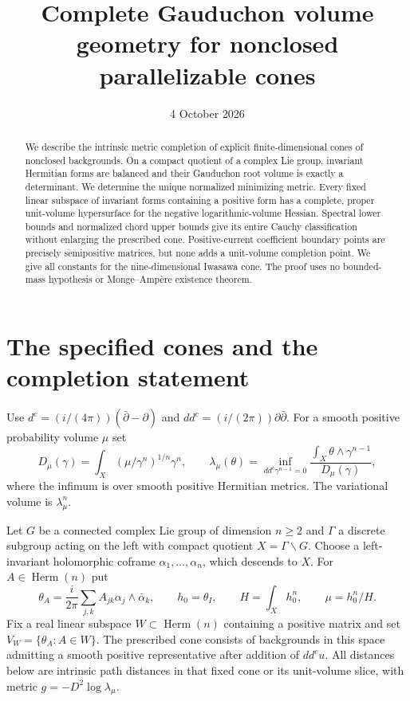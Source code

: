 \documentclass[11pt]{article}
\title{Complete Gauduchon volume geometry for nonclosed parallelizable cones}
\author{}
\date{4 October 2026}
\newcommand{\ddc}{dd^c}
\newcommand{\Herm}{\operatorname{Herm}}
\begin{document}
\maketitle
\begin{abstract}
We describe the intrinsic metric completion of explicit finite-dimensional
cones of nonclosed backgrounds. On a compact quotient of a complex Lie
group, invariant Hermitian forms are balanced and their Gauduchon root
volume is exactly a determinant. We determine the unique normalized
minimizing metric. Every fixed linear subspace of invariant forms containing
a positive form has a complete, proper unit-volume hypersurface for the
negative logarithmic-volume Hessian. Spectral lower bounds and normalized
chord upper bounds give its entire Cauchy classification without enlarging
the prescribed cone. Positive-current coefficient boundary points are
precisely semipositive matrices, but none adds a unit-volume completion
point. We give all constants for the nine-dimensional Iwasawa cone.
The proof uses no bounded-mass hypothesis or Monge--Amp\`ere existence theorem.
\end{abstract}

\section{The specified cones and the completion statement}
Use $d^c=(i/(4\pi))(\bar\partial-\partial)$ and
$\ddc=(i/(2\pi))\partial\bar\partial$.
For a smooth positive probability volume $\mu$ set
\[
 D_\mu(\gamma)=\int_X(\mu/\gamma^n)^{1/n}\gamma^n,\qquad
 \lambda_\mu(\theta)=\inf_{\ddc\gamma^{n-1}=0}
       \frac{\int_X\theta\wedge\gamma^{n-1}}{D_\mu(\gamma)},
\]
where the infimum is over smooth positive Hermitian metrics.
The variational volume is $\lambda_\mu^n$.

Let $G$ be a connected complex Lie group of dimension $n\geq2$ and
$\Gamma$ a discrete subgroup acting on the left with compact quotient
$X=\Gamma\backslash G$. Choose a left-invariant holomorphic coframe
$\alpha_1,\ldots,\alpha_n$, which descends to $X$. For $A\in\Herm(n)$ put
\[
 \theta_A=\frac{i}{2\pi}\sum_{j,k}A_{jk}\alpha_j\wedge\bar\alpha_k,
 \qquad h_0=\theta_I,\qquad H=\int_Xh_0^n,\qquad \mu=h_0^n/H.
\]
Fix a real linear subspace $W\subset\Herm(n)$ containing a positive
matrix and set $V_W=\{\theta_A:A\in W\}$.
The prescribed cone consists of backgrounds in this space admitting a
smooth positive representative after addition of $\ddc u$.
All distances below are intrinsic path distances in that fixed cone or
its unit-volume slice, with metric $g=-D^2\log\lambda_\mu$.
\end{document}
